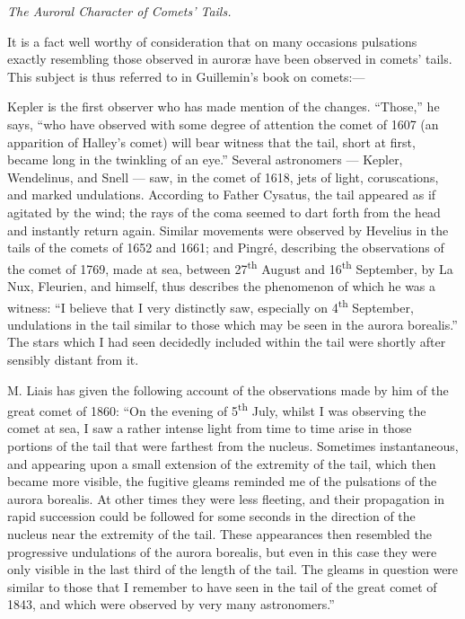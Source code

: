 \documentclass[a4paper, 12pt, oneside, polutonikogreek, english]{article}
\begin{document}
\emph{The Auroral Character of Comets' Tails.}

It is a fact well worthy of consideration that on many occasions pulsations exactly resembling those observed in auroræ have been observed in comets' tails. This subject is thus referred to in Guillemin's book on comets:---

Kepler is the first observer who has made mention of the changes. ``Those,'' he says, ``who have observed with some degree of attention the comet of 1607 (an apparition of Halley's comet) will bear witness that the tail, short at first, became long in the twinkling of an eye.'' Several astronomers --- Kepler, Wendelinus, and Snell --- saw, in the comet of 1618, jets of light, coruscations, and marked undulations. According to Father Cysatus, the tail appeared as if agitated by the wind; the rays of the coma seemed to dart forth from the head and instantly return again. Similar movements were observed by Hevelius in the tails of the comets of 1652 and 1661; and Pingré, describing the observations of the comet of 1769, made at sea, between 27\textsuperscript{th} August and 16\textsuperscript{th} September, by La Nux, Fleurien, and himself, thus describes the phenomenon of which he was a witness: ``I believe that I very distinctly saw, especially on 4\textsuperscript{th} September, undulations in the tail similar to those which may be seen in the aurora borealis.'' The stars which I had seen decidedly included within the tail were shortly after sensibly distant from it.

M. Liais has given the following account of the observations made by him of the great comet of 1860: ``On the evening of 5\textsuperscript{th} July, whilst I was observing the comet at sea, I saw a rather intense light from time to time arise in those portions of the tail that were farthest from the nucleus. Sometimes instantaneous, and appearing upon a small extension of the extremity of the tail, which then became more visible, the fugitive gleams reminded me of the pulsations of the aurora borealis. At other times they were less fleeting, and their propagation in rapid succession could be followed for some seconds in the direction of the nucleus near the extremity of the tail. These appearances then resembled the progressive undulations of the aurora borealis, but even in this case they were only visible in the last third of the length of the tail. The gleams in question were similar to those that I remember to have seen in the tail of the great comet of 1843, and which were observed by very many astronomers.''
\end{document}
